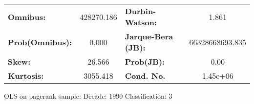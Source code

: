 \begin{center}
\begin{tabular}{lccccc}
\bottomrule
\end{tabular}
\begin{tabular}{lclc}
\textbf{Omnibus:}       & 428270.186 & \textbf{  Durbin-Watson:     } &        1.861     \\
\textbf{Prob(Omnibus):} &    0.000   & \textbf{  Jarque-Bera (JB):  } & 66328668693.835  \\
\textbf{Skew:}          &   26.566   & \textbf{  Prob(JB):          } &         0.00     \\
\textbf{Kurtosis:}      &  3055.418  & \textbf{  Cond. No.          } &     1.45e+06     \\
\bottomrule
\end{tabular}
\end{center}
\break
OLS on pagerank sample: Decade: 1990 Classification: 3
